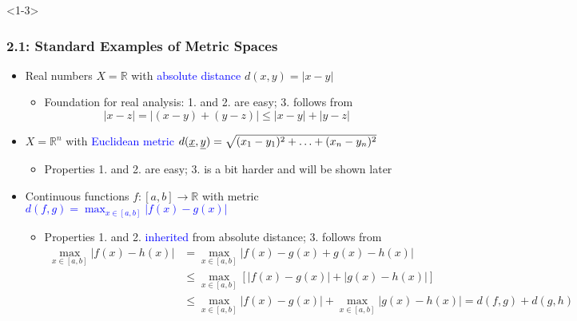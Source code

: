\documentclass[10pt,english,aspectratio=169]{beamer}
\begin{document}
\begin{frame}<1-3> \frametitle{2.1: Standard Examples of Metric Spaces}

\begin{itemize}
\setlength\itemsep{6mm}
\item<1-> Real numbers $X=\mathbb{R}$ with \textcolor{blue}{absolute distance} $d(x,y)=|x-y|$ \vspace{1mm}
\begin{itemize} 
  \setlength\itemsep{1.5mm}
  \item Foundation for real analysis: 1. and 2. are easy; 3. follows from \[ |x-z| = |(x-y) + (y-z)| \leq |x-y| + |y-z| \]
\end{itemize}

\item<2-> $X=\mathbb{R}^n$ with \textcolor{blue}{Euclidean metric $d(\underline{x},\underline{y})=\sqrt{(x_1-y_1)^2 + \ldots + (x_n-y_n)^2}\!\!\!\!\!\!$}\vspace{1mm}
\begin{itemize} 
  \setlength\itemsep{1.5mm}
  \item Properties 1. and 2. are easy; 3. is a bit harder and will be shown later
\end{itemize}

\item<3-> Continuous functions $f \colon [a,b] \to \mathbb{R}$ with metric \textcolor{blue}{$d(f,g) = \displaystyle{\max_{x\in [a,b]}} | f(x) - g(x) |\!\!\!\!\!\!\!\!\!\!\!\!\!\!\!\!\!\!\!\!\!$}\vspace{0.5mm}
\begin{itemize} 
  \setlength\itemsep{1.5mm}
  \item Properties 1. and 2. \textcolor{blue}{inherited} from absolute distance; 3. follows from
  \begin{align*}
    \max_{x\in [a,b]} | f(x) - h(x) |
    &= \max_{x\in [a,b]} | f(x) - g(x) + g(x) - h(x) |  \\
    &\leq \max_{x\in [a,b]} \left[ |f(x) - g(x)| + |g(x) - h(x)| \right] \\
    &\leq \max_{x\in [a,b]} |f(x) - g(x)| + \max_{x\in [a,b]} |g(x) - h(x)| = d(f,g) + d(g,h)
  \end{align*}
\end{itemize}


\end{itemize}
\end{frame}
\end{document}
